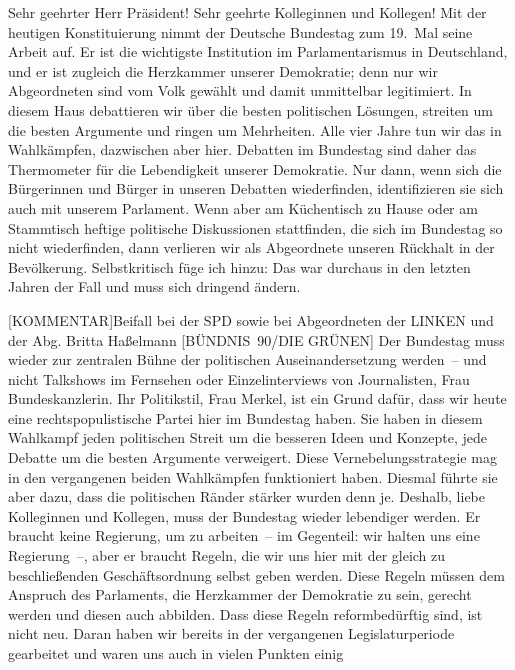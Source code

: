 \documentclass[a4paper,11pt]{article}
\begin{document}
Sehr geehrter Herr Präsident! Sehr geehrte Kolleginnen und Kollegen! Mit der heutigen Konstituierung nimmt der Deutsche Bundestag zum 19. Mal seine Arbeit auf. Er ist die wichtigste Institution im Parlamentarismus in Deutschland, und er ist zugleich die Herzkammer unserer Demokratie; denn nur wir Abgeordneten sind vom Volk gewählt und damit unmittelbar legitimiert. In diesem Haus debattieren wir über die besten politischen Lösungen, streiten um die besten Argumente und ringen um Mehrheiten. Alle vier Jahre tun wir das in Wahlkämpfen, dazwischen aber hier. Debatten im Bundestag sind daher das Thermometer für die Lebendigkeit unserer Demokratie. Nur dann, wenn sich die Bürgerinnen und Bürger in unseren Debatten wiederfinden, identifizieren sie sich auch mit unserem Parlament. Wenn aber am Küchentisch zu Hause oder am Stammtisch heftige politische Diskussionen stattfinden, die sich im Bundestag so nicht wiederfinden, dann verlieren wir als Abgeordnete unseren Rückhalt in der Bevölkerung. Selbstkritisch füge ich hinzu: Das war durchaus in den letzten Jahren der Fall und muss sich dringend ändern.

[KOMMENTAR]Beifall bei der SPD sowie bei Abgeordneten der LINKEN und der Abg. Britta Haßelmann [BÜNDNIS 90/DIE GRÜNEN]
 Der Bundestag muss wieder zur zentralen Bühne der politischen Auseinandersetzung werden – und nicht Talkshows im Fernsehen oder Einzelinterviews von Journalisten, Frau Bundeskanzlerin. Ihr Politikstil, Frau Merkel, ist ein Grund dafür, dass wir heute eine rechtspopulistische Partei hier im Bundestag haben. Sie haben in diesem Wahlkampf jeden politischen Streit um die besseren Ideen und Konzepte, jede Debatte um die besten Argumente verweigert. Diese Vernebelungsstrategie mag in den vergangenen beiden Wahlkämpfen funktioniert haben. Diesmal führte sie aber dazu, dass die politischen Ränder stärker wurden denn je. Deshalb, liebe Kolleginnen und Kollegen, muss der Bundestag wieder lebendiger werden. Er braucht keine Regierung, um zu arbeiten – im Gegenteil: wir halten uns eine Regierung –, aber er braucht Regeln, die wir uns hier mit der gleich zu beschließenden Geschäftsordnung selbst geben werden. Diese Regeln müssen dem Anspruch des Parlaments, die Herzkammer der Demokratie zu sein, gerecht werden und diesen auch abbilden. Dass diese Regeln reformbedürftig sind, ist nicht neu. Daran haben wir bereits in der vergangenen Legislaturperiode gearbeitet und waren uns auch in vielen Punkten einig
\end{document}

